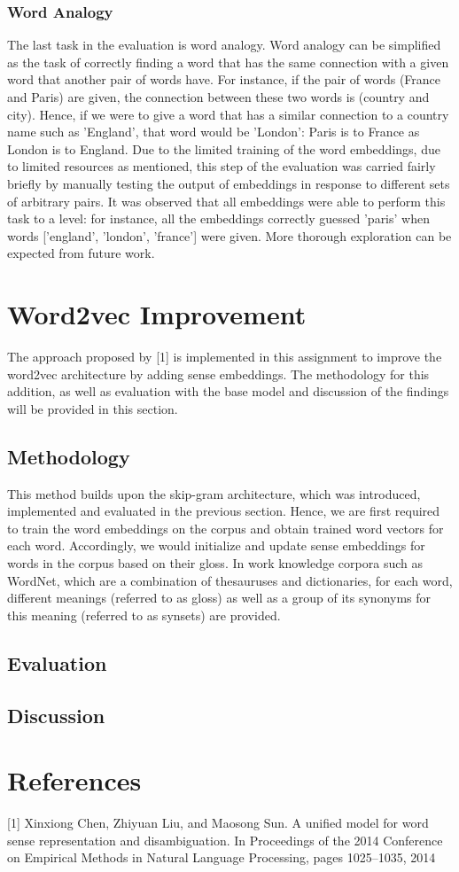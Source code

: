 \documentclass[12pt,a4paper]{article}
\begin{document}
	\subsubsection{Word Analogy}
	The last task in the evaluation is word analogy. Word analogy can be simplified as the task of correctly finding a word that has the same connection with a given word that another pair of words have. For instance, if the pair of words (France and Paris) are given, the connection between these two words is (country and city). Hence, if we were to give a word that has a similar connection to a country name such as 'England', that word would be 'London': Paris is to France as London is to England. Due to the limited training of the word embeddings, due to limited resources as mentioned, this step of the evaluation was carried fairly briefly by manually testing the output of embeddings in response to different sets of arbitrary pairs. It was observed that all embeddings were able to perform this task to a level: for instance, all the embeddings correctly guessed 'paris' when words ['england', 'london', 'france'] were given. More thorough exploration can be expected from future work.
	
	\section{Word2vec Improvement}
	The approach proposed by [1] is implemented in this assignment to improve the word2vec architecture by adding sense embeddings. The methodology for this addition, as well as evaluation with the base model and discussion of the findings will be provided in this section.

	\subsection{Methodology}
	This method builds upon the skip-gram architecture, which was introduced, implemented and evaluated in the previous section. Hence, we are first required to train the word embeddings on the corpus and obtain trained word vectors for each word. Accordingly, we would initialize and update sense embeddings for words in the corpus based on their gloss. In work knowledge corpora such as WordNet, which are a combination of thesauruses and dictionaries, for each word, different meanings (referred to as gloss) as well as a group of its synonyms for this meaning (referred to as synsets) are provided.
	
	\subsection{Evaluation}
	
	\subsection{Discussion}
	
	\section{References}
	[1] Xinxiong Chen, Zhiyuan Liu, and Maosong Sun. A unified model for word
	sense representation and disambiguation. In Proceedings of the 2014 Conference on Empirical Methods in Natural Language Processing,
	pages 1025–1035, 2014
\end{document}

